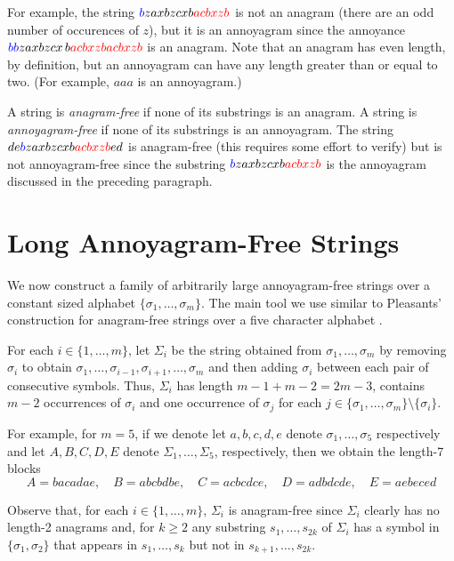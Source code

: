 \documentclass[kpfonts]{patmorin}
\newcommand{\colored}[2]{{\color{#1}#2}}
\begin{document}
For example, the string $\colored{blue}{b}zaxbzcxb\colored{red}{acbxzb}$ is not an anagram (there are an odd number of occurences of $z$), but it is an annoyagram since the annoyance $\colored{blue}{bb}zaxbzcx\,b\colored{red}{acbxzb acbxzb}$ is an anagram.  Note that an anagram has even length, by definition, but an annoyagram can have any length greater than or equal to two. (For example, $aaa$ is an annoyagram.)

A string is \emph{anagram-free} if none of its substrings is an anagram. A string is \emph{annoyagram-free} if none of its substrings is an annoyagram. The string $de\colored{blue}{b}zaxbzcxb\colored{red}{acbxzb}ed$ is anagram-free (this requires some effort to verify) but is not annoyagram-free since the substring $\colored{blue}{b}zaxbzcxb\colored{red}{acbxzb}$ is the annoyagram discussed in the preceding paragraph.

\section{Long Annoyagram-Free Strings}


We now construct a family of arbitrarily large annoyagram-free strings over a constant sized alphabet $\{\sigma_1,\ldots,\sigma_m\}$.  The main tool we use similar to Pleasants' construction for anagram-free strings over a five character alphabet \cite{pleasants:non-repetitive}.

For each $i\in\{1,\ldots,m\}$, let $\Sigma_i$ be the string obtained from $\sigma_1,\ldots,\sigma_m$ by removing $\sigma_i$ to obtain $\sigma_{1},\ldots,\sigma_{i-1},\sigma_{i+1},\ldots,\sigma_m$ and then adding $\sigma_i$ between each pair of consecutive symbols.  Thus, $\Sigma_i$ has length $m-1+m-2=2m-3$, contains $m-2$ occurrences of $\sigma_i$ and one occurrence of $\sigma_j$ for each $j\in\{\sigma_1,\ldots,\sigma_m\}\setminus\{\sigma_i\}$.

For example, for $m=5$, if we denote let $a,b,c,d,e$ denote $\sigma_1,\ldots,\sigma_5$ respectively and let $A,B,C,D,E$ denote $\Sigma_1,\ldots,\Sigma_5$, respectively, then we obtain the length-7 blocks
\[ A = bacadae, \quad B=abcbdbe,\quad C=acbcdce,\quad D=adbdcde,\quad E=aebeced \]

Observe that, for each $i\in\{1,\ldots,m\}$, $\Sigma_i$ is anagram-free since $\Sigma_i$ clearly has no length-2 anagrams and, for $k\ge 2$ any substring $s_1,\ldots,s_{2k}$ of $\Sigma_i$ has a symbol in $\{\sigma_1,\sigma_2\}$ that appears in $s_1,\ldots,s_k$ but not in $s_{k+1},\ldots,s_{2k}$.
\end{document}
